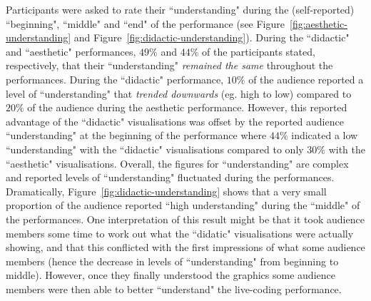\documentclass{sig-alternate}
\begin{document}
Participants were asked to rate their ``understanding" during the (self-reported) ``beginning", ``middle" and ``end" of the performance (see Figure~\ref{fig:aesthetic-understanding} and Figure~\ref{fig:didactic-understanding}). During the ``didactic" and ``aesthetic" performances, $49\%$ and $44\%$ of the participants stated, respectively, that their ``understanding" {\it remained the same} throughout the performances. During the ``didactic" performance, $10\%$ of the audience reported a level of ``understanding" that {\it trended downwards} (eg. high to low) compared to $20\%$ of the audience during the aesthetic performance. However, this reported advantage of the ``didactic" visualisations was offset by the reported audience ``understanding" at the beginning of the performance where $44\%$ indicated a low ``understanding" with the ``didactic" visualisations compared to only $30\%$ with the ``aesthetic" visualisations. Overall, the figures for ``understanding" are complex and reported levels of ``understanding" fluctuated during the performances. Dramatically, Figure~\ref{fig:didactic-understanding} shows that a very small proportion of the audience reported ``high understanding" during the ``middle" of the performances. One interpretation of this result might be that it took audience members some time to work out what the ``didatic" visualisations were actually showing, and that this conflicted with the first impressions of what some audience members (hence the decrease in levels of ``understanding" from beginning to middle). However, once they finally understood the graphics some audience members were then able to better ``understand" the live-coding performance. 


\end{document}
